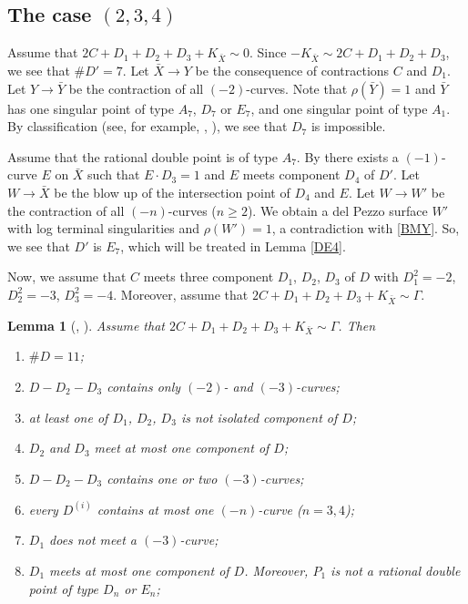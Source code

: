 \documentclass[10pt,oneside,reqno]{amsart}
\newtheorem{lemma}[theorem]{Lemma}
\theoremstyle{definition}
\theoremstyle{remark}
\numberwithin{equation}{section}
\begin{document}
\subsection{The case $(2,3,4)$} Assume that $2C+D_1+D_2+D_3+K_{\bar{X}}\sim 0$. Since $-K_{\bar{X}}\sim 2C+D_1+D_2+D_3$, we see that $\# D'=7$. Let $\bar{X}\rightarrow Y$ be the consequence of contractions $C$ and $D_1$. Let $Y\rightarrow\bar{Y}$ be the contraction of all $(-2)$-curves. Note that $\rho(\bar{Y})=1$ and $\bar{Y}$ has one singular point of type $A_7$, $D_7$ or $E_7$, and one singular point of type $A_1$. By classification (see, for example, {\cite{Fur}}, {\cite{AN}}), we see that $D_7$ is impossible.

Assume that the rational double point is of type $A_7$. By {\cite{AN}} there exists a $(-1)$-curve $E$ on $\bar{X}$ such that $E\cdot D_3=1$ and $E$ meets component $D_4$ of $D'$. Let $W\rightarrow\bar{X}$ be the blow up of the intersection point of $D_4$ and $E$. Let $W\rightarrow W'$ be the contraction of all $(-n)$-curves ($n\geq 2$). We obtain a del Pezzo surface $W'$ with log terminal singularities and $\rho(W')=1$, a contradiction with \ref{BMY}. So, we see that $D'$ is $E_7$, which will be treated in Lemma \ref{DE4}.

Now, we assume that $C$ meets three component $D_1$, $D_2$, $D_3$ of $D$ with $D_1^2=-2$, $D_2^2=-3$, $D_3^2=-4$. Moreover, assume that $2C+D_1+D_2+D_3+K_{\bar{X}}\sim \Gamma$.

\begin{lemma}[{\cite{GZ}, \cite{KT}}]
\label{Case234-1}
Assume that $2C+D_1+D_2+D_3+K_{\bar{X}}\sim \Gamma$. Then
\begin{enumerate}
\item $\#D=11$;
\item $D-D_2-D_3$ contains only $(-2)$- and $(-3)$-curves;
\item at least one of $D_1$, $D_2$, $D_3$ is not isolated component of $D$;
\item $D_2$ and $D_3$ meet at most one component of $D$;
\item $D-D_2-D_3$ contains one or two $(-3)$-curves;
\item every $D^{(i)}$ contains at most one $(-n)$-curve ($n=3,4$);
\item $D_1$ does not meet a $(-3)$-curve;
\item $D_1$ meets at most one component of $D$. Moreover, $P_1$ is not a rational double point of type $D_n$ or $E_n$;
\end{enumerate}
\end{lemma}
\end{document}
